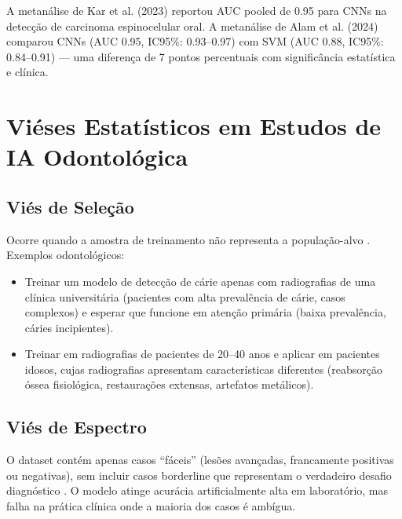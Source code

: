 A metanálise de Kar et al. (2023) \cite{ODT-010} reportou AUC pooled de 0.95 para CNNs na detecção de carcinoma espinocelular oral. A metanálise de Alam et al. (2024) \cite{ODT-015} comparou CNNs (AUC 0.95, IC95\%: 0.93--0.97) com SVM (AUC 0.88, IC95\%: 0.84--0.91) — uma diferença de 7 pontos percentuais com significância estatística e clínica.


\section{Viéses Estatísticos em Estudos de IA Odontológica}

\subsection{Viés de Seleção}

Ocorre quando a amostra de treinamento não representa a população-alvo . Exemplos odontológicos:

\begin{itemize}
    \item Treinar um modelo de detecção de cárie apenas com radiografias de uma clínica universitária (pacientes com alta prevalência de cárie, casos complexos) e esperar que funcione em atenção primária (baixa prevalência, cáries incipientes).
    \item Treinar em radiografias de pacientes de 20--40 anos e aplicar em pacientes idosos, cujas radiografias apresentam características diferentes (reabsorção óssea fisiológica, restaurações extensas, artefatos metálicos).
\end{itemize}

\subsection{Viés de Espectro}

O dataset contém apenas casos ``fáceis'' (lesões avançadas, francamente positivas ou negativas), sem incluir casos borderline que representam o verdadeiro desafio diagnóstico . O modelo atinge acurácia artificialmente alta em laboratório, mas falha na prática clínica onde a maioria dos casos é ambígua.


